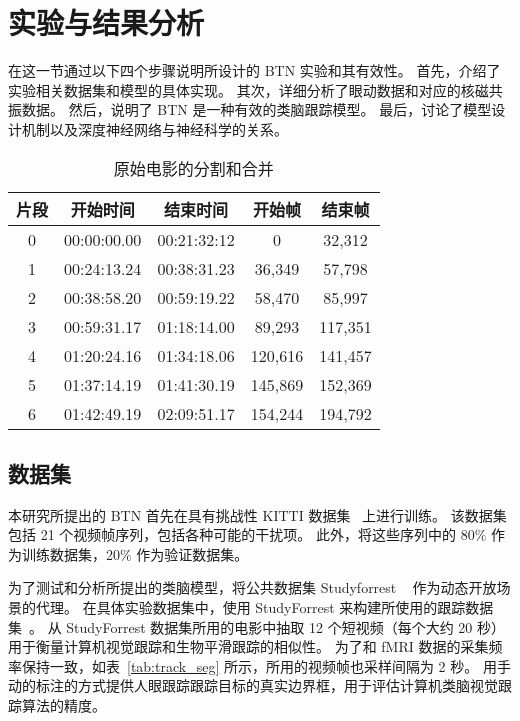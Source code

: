 \section{实验与结果分析} \label{sec:c2:results}
在这一节通过以下四个步骤说明所设计的 BTN 实验和其有效性。
首先，介绍了实验相关数据集和模型的具体实现。
其次，详细分析了眼动数据和对应的核磁共振数据。
然后，说明了 BTN 是一种有效的类脑跟踪模型。
最后，讨论了模型设计机制以及深度神经网络与神经科学的关系。


\vspace{0.6em}
\begin{table}[htbp]\wuhao
	\centering
	\caption{原始电影的分割和合并
	}
	\vspace{0.3em} 
	\begin{tabular} {c|cccc}
		\hline
		片段  & 开始时间  & 结束时间   & 开始帧 & 结束帧 \\ 
		\hline
		0   &00:00:00.00 &00:21:32:12 &0 &32,312  \\
		1   &00:24:13.24 &00:38:31.23 &36,349 &57,798   \\
		2   &00:38:58.20 &00:59:19.22 &58,470 &85,997   \\
		3   &00:59:31.17 &01:18:14.00 &89,293 &117,351   \\
		4   &01:20:24.16 &01:34:18.06 &120,616 &141,457   \\
		5   &01:37:14.19 &01:41:30.19 &145,869 &152,369   \\
		6   &01:42:49.19 &02:09:51.17 &154,244 &194,792   \\
		\hline
	\end{tabular}
	\label{tab:movie_seg}
\end{table}


\subsection{数据集}
本研究所提出的 BTN 首先在具有挑战性 KITTI 数据集~\cite{kitti} 上进行训练。
该数据集包括 21 个视频帧序列，包括各种可能的干扰项。
此外，将这些序列中的 80$\%$ 作为训练数据集，20$\%$ 作为验证数据集。

为了测试和分析所提出的类脑模型，将公共数据集 Studyforrest ~\cite{gaze_forrest} 作为动态开放场景的代理。
在具体实验数据集中，使用 StudyForrest 来构建所使用的跟踪数据集~\cite{gaze_forrest}。
从 StudyForrest 数据集所用的电影中抽取 12 个短视频（每个大约 20 秒）用于衡量计算机视觉跟踪和生物平滑跟踪的相似性。
为了和 fMRI 数据的采集频率保持一致，如表~\ref{tab:track_seg} 所示，所用的视频帧也采样间隔为 2 秒。
用手动的标注的方式提供人眼跟踪跟踪目标的真实边界框，用于评估计算机类脑视觉跟踪算法的精度。




